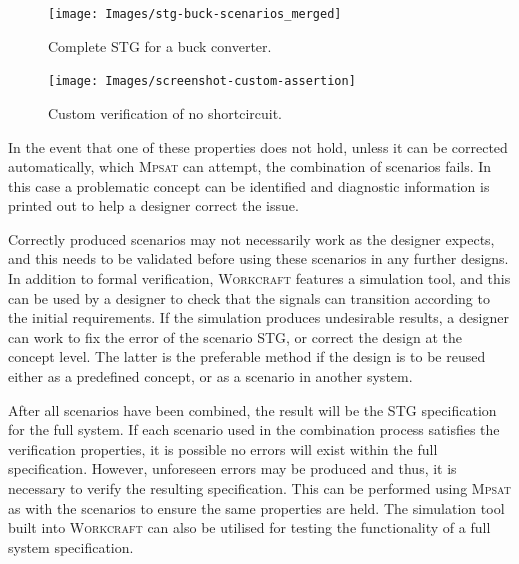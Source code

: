 \documentclass[british, journal]{IEEEtran}
\newcommand{\noun}[1]{\textsc{#1}}
\begin{document}
\begin{figure}[t]
\begin{centering}
\texttt{[image: Images/stg-buck-scenarios\_merged]}
\par\end{centering}
\begin{centering}
\protect\caption{\label{fig:buck STG}Complete STG for a buck converter.}
\par\end{centering}
\vspace{-3mm}
\end{figure}

\begin{figure}[h]
\begin{centering}
\texttt{[image: Images/screenshot-custom-assertion]}
\par\end{centering}
\begin{centering}
\protect\caption{\label{fig:custom_assertion}Custom verification of no shortcircuit.}
\par\end{centering}
\vspace{-3mm}
\end{figure}

In the event that one of these properties does not hold, unless it can be corrected
automatically, which \noun{Mpsat} can attempt, the combination of scenarios fails.
In this case a problematic concept can be identified and diagnostic information
is printed out to help a designer correct the issue.

Correctly produced scenarios may not necessarily work as the designer expects,
and this needs to be validated before using these scenarios
in any further designs. In addition to formal verification, \noun{Workcraft}
features a simulation tool,
and this can be used by a designer to check that the signals can transition
according to the initial requirements. If the simulation produces
undesirable results, a designer can work to fix the error of the scenario
STG, or correct the design at the concept level. The latter is the
preferable method if the design is to be reused either as a predefined
concept, or as a scenario in another system.

After all scenarios have been combined, the result will be the STG specification
for the full system. If each scenario used in the combination process satisfies
the verification properties, it is possible no errors will exist within the full
specification. However,  unforeseen errors may be produced
and thus, it is necessary to verify the resulting specification. This can
be performed using \noun{Mpsat} as with the scenarios to ensure the same
properties are held. The simulation tool built into \noun{Workcraft} can also
be utilised for testing the functionality of a full system specification.
\end{document}
